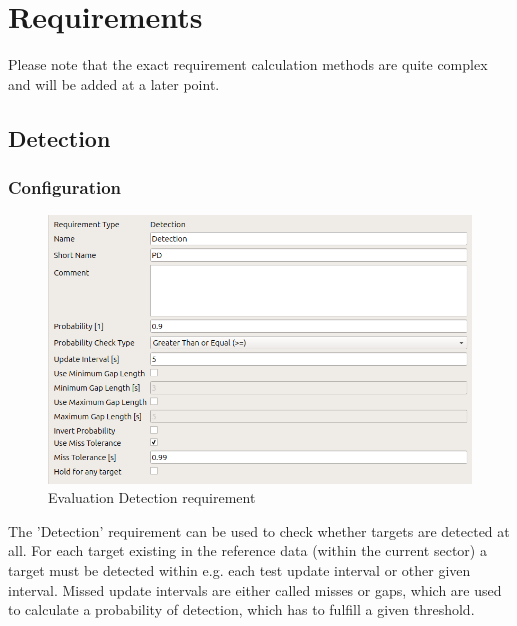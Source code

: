 \section{Requirements}
\label{sec:eval_requirements} 

Please note that the exact requirement calculation methods are quite complex and will be added at a later point. \\

\subsection{Detection}
\label{sec:eval_req_detection} 

\subsubsection{Configuration}

\begin{figure}[H]
    \includegraphics[width=14cm,frame]{figures/eval_req_detection.png}
  \caption{Evaluation Detection requirement}
\end{figure}

The 'Detection' requirement can be used to check whether targets are detected at all. For each target existing in the reference data (within the current sector) a target must be detected within e.g. each test update interval or other given interval. Missed update intervals are either called misses or gaps, which are used to calculate a probability of detection, which has to fulfill a given threshold. \\

